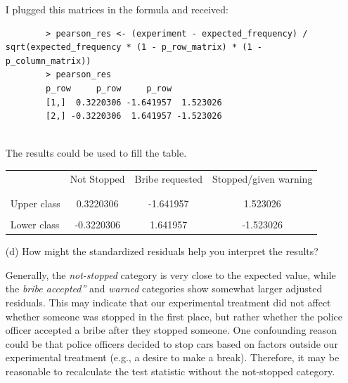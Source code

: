 \documentclass[12pt,letterpaper]{article}
\begin{document}
\begin{enumerate}
	I plugged this matrices in the formula and received:
	
	\begin{verbatim}
		> pearson_res <- (experiment - expected_frequency) / sqrt(expected_frequency * (1 - p_row_matrix) * (1 - p_column_matrix))
		> pearson_res
		p_row     p_row     p_row
		[1,]  0.3220306 -1.641957  1.523026
		[2,] -0.3220306  1.641957 -1.523026
		
	\end{verbatim}
	
	The results could be used to fill the table. 
	
	\begin{table}[h]
		\centering
		\begin{tabular}{l | c c c }
			& Not Stopped & Bribe requested & Stopped/given warning \\
			\\[-1.8ex] 
			\hline \\[-1.8ex]
			Upper class & 0.3220306 & -1.641957 & 1.523026  \\
			\\
			Lower class & -0.3220306 & 1.641957 & -1.523026   \\
			
		\end{tabular}
	\end{table}
	
	
	\vspace{7cm}
	\item [(d)] How might the standardized residuals help you interpret the results?  
	
	Generally, the \textit{not-stopped} category is very close to the expected value, while the \textit{bribe accepted”} and \textit{warned} categories show somewhat larger adjusted residuals. 
	\newline
	This may indicate that our experimental treatment did not affect whether someone was stopped in the first place, but rather whether the police officer accepted a bribe after they stopped someone. One confounding reason could be that police officers decided to stop cars based on factors outside our experimental treatment (e.g., a desire to make a break). Therefore, it may be reasonable to recalculate the test statistic without the not-stopped category. 
	
	
\end{enumerate}
\newpage
\end{document}
